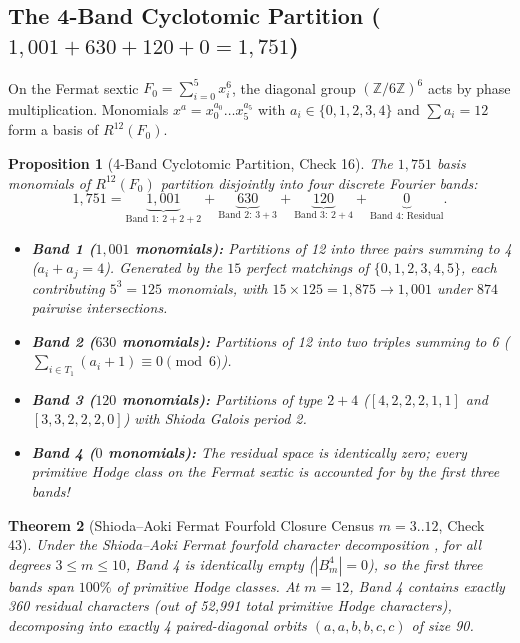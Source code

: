\documentclass[11pt,a4paper]{article}
\newtheorem{theorem}{Theorem}[section]
\newtheorem{proposition}[theorem]{Proposition}
\theoremstyle{definition}
\theoremstyle{remark}
\begin{document}
\subsection{The 4-Band Cyclotomic Partition ($1,001 + 630 + 120 + 0 = 1,751$)}
On the Fermat sextic $F_0 = \sum_{i=0}^5 x_i^6$, the diagonal group $(\mathbb{Z}/6\mathbb{Z})^6$ acts by phase multiplication. Monomials $x^a = x_0^{a_0} \dots x_5^{a_5}$ with $a_i \in \{0,1,2,3,4\}$ and $\sum a_i = 12$ form a basis of $R^{12}(F_0)$.

\begin{proposition}[4-Band Cyclotomic Partition, Check 16]
The $1,751$ basis monomials of $R^{12}(F_0)$ partition disjointly into four discrete Fourier bands:
\begin{equation}
1,751 = \underbrace{1,001}_{\text{Band 1: } 2+2+2} + \underbrace{630}_{\text{Band 2: } 3+3} + \underbrace{120}_{\text{Band 3: } 2+4} + \underbrace{0}_{\text{Band 4: Residual}}.
\end{equation}
\begin{itemize}[leftmargin=1.5em]
\item \textbf{Band 1 ($1,001$ monomials):} Partitions of 12 into three pairs summing to 4 ($a_i + a_j = 4$). Generated by the $15$ perfect matchings of $\{0,1,2,3,4,5\}$, each contributing $5^3 = 125$ monomials, with $15 \times 125 = 1,875 \to 1,001$ under $874$ pairwise intersections.
\item \textbf{Band 2 ($630$ monomials):} Partitions of 12 into two triples summing to 6 ($\sum_{i \in T_1} (a_i+1) \equiv 0 \pmod 6$).
\item \textbf{Band 3 ($120$ monomials):} Partitions of type $2+4$ ($[4,2,2,2,1,1]$ and $[3,3,2,2,2,0]$) with Shioda Galois period 2.
\item \textbf{Band 4 ($0$ monomials):} The residual space is identically zero; every primitive Hodge class on the Fermat sextic is accounted for by the first three bands!
\end{itemize}
\end{proposition}

\begin{theorem}[Shioda--Aoki Fermat Fourfold Closure Census $m=3..12$, Check 43]
\label{thm:shioda_census}
Under the Shioda--Aoki Fermat fourfold character decomposition \cite{Shioda1979,Aoki1983}, for all degrees $3 \le m \le 10$, Band 4 is identically empty ($|B_m^4| = 0$), so the first three bands span $100\%$ of primitive Hodge classes. At $m=12$, Band 4 contains exactly 360 residual characters (out of 52,991 total primitive Hodge characters), decomposing into exactly 4 paired-diagonal orbits $(a, a, b, b, c, c)$ of size 90.
\end{theorem}
\end{document}
